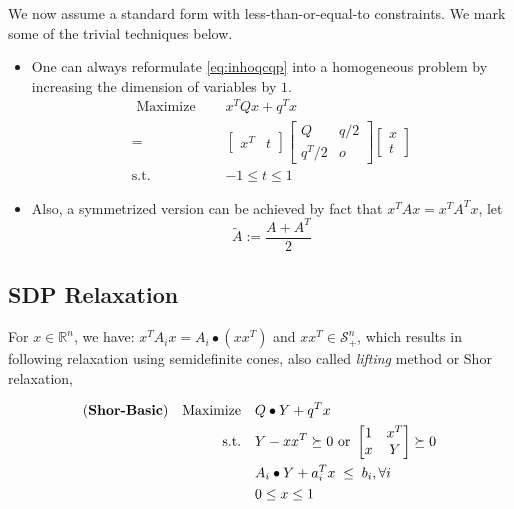 \documentclass[../main]{subfiles}
\begin{document}
We now assume a standard form with less-than-or-equal-to constraints. We mark some of the trivial techniques below.
\begin{itemize}
  \item One can always reformulate \eqref{eq:inhoqcqp} into a homogeneous problem by increasing the dimension of variables by \(1\).
        \begin{equation}
          \begin{aligned}
            \textrm { Maximize } \quad & x^{T} Q x  + q^Tx         \\
            =                          & \begin{bmatrix}x^T & t\end{bmatrix}
            \begin{bmatrix} Q   & q / 2\\ q^T /2 & o \end{bmatrix}
            \begin{bmatrix} x \\ t\end{bmatrix}                              \\
            \mathrm{s.t.} \quad        & - 1\le t \le 1
          \end{aligned}
        \end{equation}
  \item Also, a symmetrized version can be achieved by fact that \(x^TAx = x^TA^Tx\), let
        \begin{equation}
          \tilde A := \frac{A+A^T}{2}
        \end{equation}
\end{itemize}




\subsection{SDP Relaxation}
For \(x \in \mathbb{R}^{n}\), we have: \(x^{T} A_{i} x = A_i \bullet (xx^T)\) and \(xx^T \in \mathcal{S}^n_{+}\), which results in following relaxation using semidefinite cones, also called \textit{lifting} method or Shor relaxation,

\begin{equation}\label{eq:shor_basic}
  \begin{aligned}
    (\textbf{Shor-Basic})\quad \mathrm{Maximize}\quad & Q\bullet Y   + q^T x                                             \\
    \mathrm{s.t.}  \quad                           & Y-xx^T \succeq 0 \text { or }\begin{bmatrix} 1 & x^{T} \\ x & Y \end{bmatrix} \succeq 0 \\
                                                   & A_i \bullet Y + a_i^Tx \; \le  \; b_i, \forall i                 \\
                                                   & 0\le x\le 1
  \end{aligned}
\end{equation}
\end{document}
